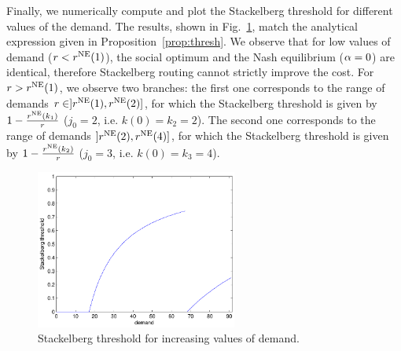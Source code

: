 Finally, we numerically compute and plot the Stackelberg threshold for different values of the demand. The results, shown in Fig.~\ref{fig:num_stack_thresh}, match the analytical expression given in Proposition~\ref{prop:thresh}. We observe that for low values of demand ($r < r^{\textup{NE}} ( 1 )$), the social optimum and the Nash equilibrium ($\alpha = 0$) are identical, therefore Stackelberg routing cannot strictly improve the cost. For $r > r^{\textup{NE}} ( 1 )$, we observe two branches: the first one corresponds to the range of demands $r \in ]r^{\textup{NE}} ( 1 ), r^{\textup{NE}} ( 2 )]$, for which the Stackelberg threshold is given by $1-\frac{r^{\textup{NE}} ( k_1 )}{r}$ ($j_0 = 2$, i.e. $k(0) = k_2 = 2$). The second one corresponds to the range of demands $]r^{\textup{NE}} ( 2 ), r^{\textup{NE}} ( 4 )]$, for which the Stackelberg threshold is given by $1-\frac{r^{\textup{NE}} ( k_2 )}{r}$ ($j_0 = 3$, i.e. $k(0) = k_3 = 4$).


\begin{figure}[h]
\centering
\includegraphics[width = 2.6in]{figures/threshold}
\caption{Stackelberg threshold for increasing values of demand.}
\label{fig:num_stack_thresh}
\end{figure}


